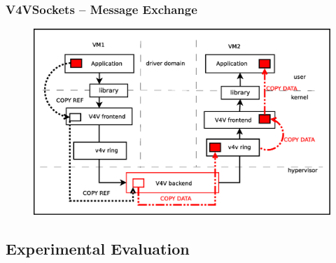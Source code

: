 \documentclass[red,slidestop,notes,compress,mathserif]{beamer}
\begin{document}
%
%
%
\begin{frame}
\frametitle{V4VSockets -- Message Exchange}
\begin{figure}
\includegraphics[scale=0.30]{figures/v4vsockets.eps}
\end{figure}
\end{frame}



%
%
\subsection{Experimental Evaluation}
\end{document}
